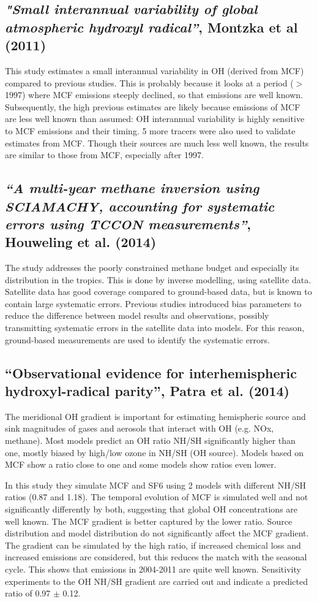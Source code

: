 \subsection{\textit{"Small interannual variability of global atmospheric hydroxyl radical”}, Montzka et al (2011)}
This study estimates a small interannual variability in OH (derived from MCF) compared to previous studies. This is probably because it looks at a period ($>$ 1997) where MCF emissions steeply declined, so that emissions are well known. Subsequently, the high previous estimates are likely because emissions of MCF are less well known than assumed: OH interannual variability is highly sensitive to MCF emissions and their timing.
5 more tracers were also used to validate estimates from MCF. Though their sources are much less well known, the results are similar to those from MCF, especially after 1997.

\subsection{\textit{“A multi-year methane inversion using SCIAMACHY, accounting for systematic errors using TCCON measurements”}, Houweling et al. (2014)}
The study addresses the poorly constrained methane budget and especially its distribution in the tropics. This is done by inverse modelling, using satellite data. Satellite data has good coverage compared to ground-based data, but is known to contain large systematic errors.
Previous studies introduced bias parameters to reduce the difference between model results and observations, possibly transmitting systematic errors in the satellite data into models. For this reason, ground-based measurements are used to identify the systematic errors. 

\subsection{“Observational evidence for interhemispheric hydroxyl-radical parity”, Patra et al. (2014)}
The meridional OH gradient is important for estimating hemispheric source and sink magnitudes of gases and aerosols that interact with OH (e.g. NOx, methane). Most models predict an OH ratio NH/SH significantly higher than one, mostly biased by high/low ozone in NH/SH (OH source). Models based on MCF show a ratio close to one and some models show ratios even lower.

In this study they simulate MCF and SF6 using 2 models with different NH/SH ratios (0.87 and 1.18). The temporal evolution of MCF is simulated well and not significantly differently by both, suggesting that global OH concentrations are well known. The MCF gradient is better captured by the lower ratio. Source distribution and model distribution do not significantly affect the MCF gradient. The gradient can be simulated by the high ratio, if increased chemical loss and increased emissions are considered, but this reduces the match with the seasonal cycle. This shows that emissions in 2004-2011 are quite well known. Sensitivity experiments to the OH NH/SH gradient are carried out and indicate a predicted ratio of 0.97 $\pm$ 0.12.

